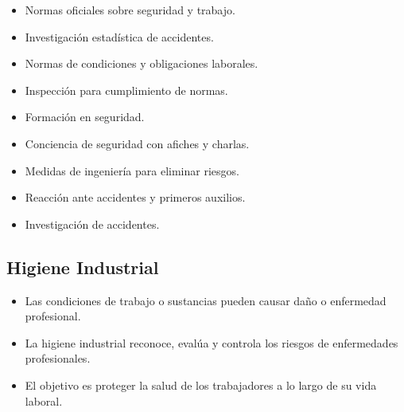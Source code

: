 \documentclass{article} %
\begin{document}
\begin{itemize}[label={},left=0pt,align=parleft]
    \item \begin{highlightbox}[levelone] Normas oficiales sobre seguridad y trabajo. \end{highlightbox}
    \item \begin{highlightbox}[levelone] Investigación estadística de accidentes. \end{highlightbox}
    \item \begin{highlightbox}[levelone] Normas de condiciones y obligaciones laborales. \end{highlightbox}
    \item \begin{highlightbox}[levelone] Inspección para cumplimiento de normas. \end{highlightbox}
    \item \begin{highlightbox}[levelone] Formación en seguridad. \end{highlightbox}
    \item \begin{highlightbox}[levelone] Conciencia de seguridad con afiches y charlas. \end{highlightbox}
    \item \begin{highlightbox}[levelone] Medidas de ingeniería para eliminar riesgos. \end{highlightbox}
    \item \begin{highlightbox}[levelone] Reacción ante accidentes y primeros auxilios. \end{highlightbox}
    \item \begin{highlightbox}[levelone] Investigación de accidentes. \end{highlightbox}
\end{itemize}

\subsection{Higiene Industrial}

\begin{itemize}[label={},left=0pt,align=parleft]
    \item \begin{highlightbox}[levelone] Las condiciones de trabajo o sustancias pueden causar daño o enfermedad profesional. \end{highlightbox}
    \item \begin{highlightbox}[levelone] La higiene industrial reconoce, evalúa y controla los riesgos de enfermedades profesionales. \end{highlightbox}
    \item \begin{highlightbox}[levelone] El objetivo es proteger la salud de los trabajadores a lo largo de su vida laboral. \end{highlightbox}
\end{itemize}
\end{document}
